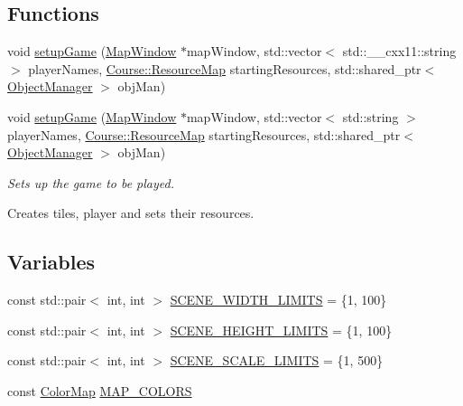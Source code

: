 \subsection*{Functions}
\begin{DoxyCompactItemize}
\item 
void \hyperlink{namespaceGame_a78e1e361404dcd444857b4bc2ba03c54}{setup\-Game} (\hyperlink{classMapWindow}{Map\-Window} $\ast$map\-Window, std\-::vector$<$ std\-::\-\_\-\-\_\-cxx11\-::string $>$ player\-Names, \hyperlink{namespaceCourse_ab9a46ed9cd00485e318e5731ea2f78d9}{Course\-::\-Resource\-Map} starting\-Resources, std\-::shared\-\_\-ptr$<$ \hyperlink{classGame_1_1ObjectManager}{Object\-Manager} $>$ obj\-Man)
\item 
void \hyperlink{namespaceGame_ab354e9f1d250a78a0af38120399542d0}{setup\-Game} (\hyperlink{classMapWindow}{Map\-Window} $\ast$map\-Window, std\-::vector$<$ std\-::string $>$ player\-Names, \hyperlink{namespaceCourse_ab9a46ed9cd00485e318e5731ea2f78d9}{Course\-::\-Resource\-Map} starting\-Resources, std\-::shared\-\_\-ptr$<$ \hyperlink{classGame_1_1ObjectManager}{Object\-Manager} $>$ obj\-Man)
\begin{DoxyCompactList}\small\item\em Sets up the game to be played. \par
Creates tiles, player and sets their resources. \end{DoxyCompactList}\end{DoxyCompactItemize}
\subsection*{Variables}
\begin{DoxyCompactItemize}
\item 
const std\-::pair$<$ int, int $>$ \hyperlink{namespaceGame_a6c2a6fd6f11a56a4154caa8fcd93c697}{S\-C\-E\-N\-E\-\_\-\-W\-I\-D\-T\-H\-\_\-\-L\-I\-M\-I\-T\-S} = \{1, 100\}
\item 
const std\-::pair$<$ int, int $>$ \hyperlink{namespaceGame_a6e134f98c66ebe13d5b90edfcde55739}{S\-C\-E\-N\-E\-\_\-\-H\-E\-I\-G\-H\-T\-\_\-\-L\-I\-M\-I\-T\-S} = \{1, 100\}
\item 
const std\-::pair$<$ int, int $>$ \hyperlink{namespaceGame_abe5aac346864cae6fd721ae3467920c4}{S\-C\-E\-N\-E\-\_\-\-S\-C\-A\-L\-E\-\_\-\-L\-I\-M\-I\-T\-S} = \{1, 500\}
\item 
const \hyperlink{namespaceGame_a1fe13161652a186ddb92a1774eeb6eaa}{Color\-Map} \hyperlink{namespaceGame_aaa1d872d39beea46fb7e5466a65838c0}{M\-A\-P\-\_\-\-C\-O\-L\-O\-R\-S}
\end{DoxyCompactItemize}


